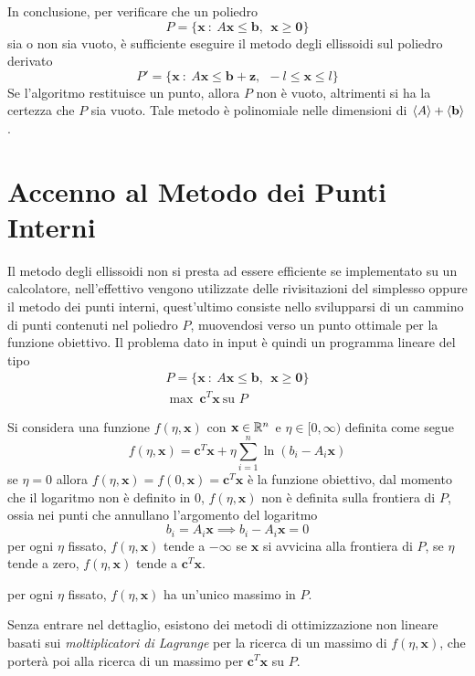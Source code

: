 \documentclass[10pt, letterpaper]{report}
\newcommand{\bb}{{\mathbf{b}}}
\newcommand{\bc}{{\mathbf{c}}}
\newcommand{\x}{{\mathbf{x}}}
\begin{document}
In conclusione, per verificare che un poliedro 
$$ P=\{\x \ : \ A\x\le\bb, \ \ \x\ge\mathbf 0\}$$
sia o non sia vuoto, è sufficiente eseguire il metodo degli ellissoidi sul poliedro derivato 
$$ P'=\{\x \ : \ A\x\le\bb+\mathbf z, \ \ -l\le\x\le l\}$$
Se l'algoritmo restituisce un punto, allora $P$ non è vuoto, altrimenti si ha la certezza che $P$ sia vuoto. Tale metodo è polinomiale nelle dimensioni di $\bra A+\bra\bb$.
\section{Accenno al Metodo dei Punti Interni}
Il metodo degli ellissoidi non si presta ad essere efficiente se implementato su un calcolatore, nell'effettivo vengono utilizzate delle rivisitazioni del simplesso oppure il metodo dei punti interni, quest'ultimo consiste nello svilupparsi di un cammino di punti contenuti nel poliedro $P$, muovendosi verso un punto ottimale per la funzione obiettivo. Il problema dato in input è quindi un programma lineare del tipo \begin{eqnarray*}
    P=\{\x \ : \ A\x\le\bb, \ \ \x\ge\mathbf 0\}\\ 
    \max \ \bc^T\x \  \text{su } P
\end{eqnarray*}

\begin{figure}[h]
\end{figure}

Si considera una funzione $f(\eta,\x)$ con $\x\in\R^n$ e $\eta\in[0,\infty)$ definita come segue\begin{equation}
    f(\eta,\x)=\bc^T\x+\eta\sum_{i=1}^n\ln(b_i-A_i\x)
\end{equation}
se $\eta=0$ allora $f(\eta,\x)=f(0,\x)=\bc^T\x$ è la funzione obiettivo, dal momento che il logaritmo non è definito in 0, $f(\eta,\x)$ non è definita sulla frontiera di $P$, ossia nei punti che annullano l'argomento del logaritmo $$ b_i=A_i\x\implies b_i-A_i\x=0$$
per ogni $\eta$ fissato, $f(\eta,\x)$ tende a $-\infty$ se $\x$ si avvicina alla frontiera di $P$, se $\eta$ tende a zero, $f(\eta,\x)$ tende a $\bc^T\x$.
\begin{proposizione}
    per ogni $\eta$ fissato, $f(\eta,\x)$ ha un'unico massimo in $P$.
\end{proposizione}
Senza entrare nel dettaglio, esistono dei metodi di ottimizzazione non lineare basati sui \textit{moltiplicatori di Lagrange} per la ricerca di un massimo di $f(\eta,\x)$, che porterà poi alla ricerca di un massimo per $\bc^T\x$ su $P$.
\end{document}
